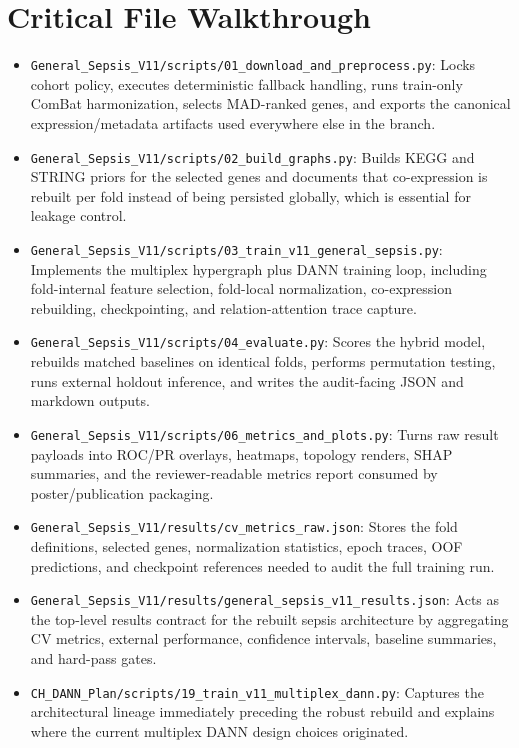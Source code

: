 \documentclass[11pt]{article}
\begin{document}
\section{Critical File Walkthrough}
\begin{itemize}
\item \texttt{General\_Sepsis\_V11/scripts/01\_download\_and\_preprocess.py}: Locks cohort policy, executes deterministic fallback handling, runs train-only ComBat harmonization, selects MAD-ranked genes, and exports the canonical expression/metadata artifacts used everywhere else in the branch.
\item \texttt{General\_Sepsis\_V11/scripts/02\_build\_graphs.py}: Builds KEGG and STRING priors for the selected genes and documents that co-expression is rebuilt per fold instead of being persisted globally, which is essential for leakage control.
\item \texttt{General\_Sepsis\_V11/scripts/03\_train\_v11\_general\_sepsis.py}: Implements the multiplex hypergraph plus DANN training loop, including fold-internal feature selection, fold-local normalization, co-expression rebuilding, checkpointing, and relation-attention trace capture.
\item \texttt{General\_Sepsis\_V11/scripts/04\_evaluate.py}: Scores the hybrid model, rebuilds matched baselines on identical folds, performs permutation testing, runs external holdout inference, and writes the audit-facing JSON and markdown outputs.
\item \texttt{General\_Sepsis\_V11/scripts/06\_metrics\_and\_plots.py}: Turns raw result payloads into ROC/PR overlays, heatmaps, topology renders, SHAP summaries, and the reviewer-readable metrics report consumed by poster/publication packaging.
\item \texttt{General\_Sepsis\_V11/results/cv\_metrics\_raw.json}: Stores the fold definitions, selected genes, normalization statistics, epoch traces, OOF predictions, and checkpoint references needed to audit the full training run.
\item \texttt{General\_Sepsis\_V11/results/general\_sepsis\_v11\_results.json}: Acts as the top-level results contract for the rebuilt sepsis architecture by aggregating CV metrics, external performance, confidence intervals, baseline summaries, and hard-pass gates.
\item \texttt{CH\_DANN\_Plan/scripts/19\_train\_v11\_multiplex\_dann.py}: Captures the architectural lineage immediately preceding the robust rebuild and explains where the current multiplex DANN design choices originated.

\end{itemize}
\end{document}
